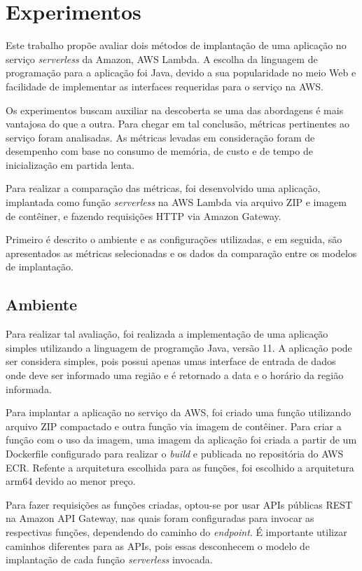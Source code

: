 \documentclass[conference]{IEEEtran}
\begin{document}
\section{Experimentos}
\label{sec:experiments}

Este trabalho propõe avaliar dois métodos de implantação de uma aplicação no serviço \textit{serverless} da Amazon, AWS Lambda.
A escolha da linguagem de programação para a aplicação foi Java, devido a sua popularidade no meio Web e facilidade de implementar as interfaces requeridas para o serviço na AWS.

Os experimentos buscam auxiliar na descoberta se uma das abordagens é mais vantajosa do que a outra. Para chegar em tal conclusão, métricas pertinentes ao serviço foram analisadas. As métricas levadas em consideração foram de desempenho com base no consumo de memória, de custo e de tempo de inicialização em partida lenta. 

Para realizar a comparação das métricas, foi desenvolvido uma aplicação, implantada como função \textit{serverless} na AWS Lambda via arquivo ZIP e imagem de contêiner, e fazendo requisições HTTP via Amazon Gateway.

Primeiro é descrito o ambiente e as configurações utilizadas, e em seguida, são apresentados as métricas selecionadas e os dados da comparação entre os modelos de implantação.


\subsection{Ambiente}
\label{subsec:environment}

Para realizar tal avaliação, foi realizada a implementação de uma aplicação simples utilizando a linguagem de programção Java, versão 11. A aplicação pode ser considera simples, pois possui apenas umas interface de entrada de dados onde deve ser informado uma região e é retornado a data e o horário da região informada. 

Para implantar a aplicação no serviço da AWS, foi criado uma função utilizando arquivo ZIP compactado e outra função via imagem de contêiner. Para criar a função com o uso da imagem, uma imagem da aplicação foi criada a partir de um Dockerfile configurado para realizar o \textit{build} e publicada no repositória do AWS ECR. Refente a arquitetura escolhida para as funções, foi escolhido a arquitetura arm64 devido ao menor preço.

Para fazer requisições as funções criadas, optou-se por usar APIs públicas REST na Amazon API Gateway, nas quais foram configuradas para invocar as respectivas funções, dependendo do caminho do \textit{endpoint}. É importante utilizar caminhos diferentes para as APIs, pois essas desconhecem o modelo de implantação de cada função \textit{serverless} invocada.
\end{document}
